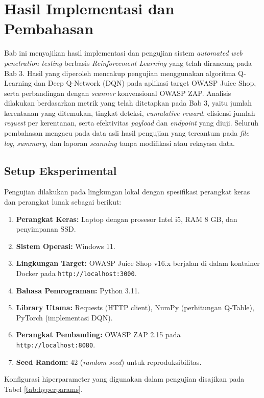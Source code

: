 \chapter{Hasil Implementasi dan Pembahasan}

Bab ini menyajikan hasil implementasi dan pengujian sistem \textit{automated web penetration testing} berbasis \textit{Reinforcement Learning} yang telah dirancang pada Bab 3. Hasil yang diperoleh mencakup pengujian menggunakan algoritma Q-Learning dan Deep Q-Network (DQN) pada aplikasi target OWASP Juice Shop, serta perbandingan dengan \textit{scanner} konvensional OWASP ZAP. Analisis dilakukan berdasarkan metrik yang telah ditetapkan pada Bab 3, yaitu jumlah kerentanan yang ditemukan, tingkat deteksi, \textit{cumulative reward}, efisiensi jumlah \textit{request} per kerentanan, serta efektivitas \textit{payload} dan \textit{endpoint} yang diuji. Seluruh pembahasan mengacu pada data asli hasil pengujian yang tercantum pada \textit{file log}, \textit{summary}, dan laporan \textit{scanning} tanpa modifikasi atau rekayasa data.

\section{Setup Eksperimental}

Pengujian dilakukan pada lingkungan lokal dengan spesifikasi perangkat keras dan perangkat lunak sebagai berikut:

\begin{enumerate}
    \item \textbf{Perangkat Keras:} Laptop dengan prosesor Intel i5, RAM 8 GB, dan penyimpanan SSD.
    \item \textbf{Sistem Operasi:} Windows 11.
    \item \textbf{Lingkungan Target:} OWASP Juice Shop v16.x berjalan di dalam kontainer Docker pada \texttt{http://localhost:3000}.
    \item \textbf{Bahasa Pemrograman:} Python 3.11.
    \item \textbf{Library Utama:} Requests (HTTP client), NumPy (perhitungan Q-Table), PyTorch (implementasi DQN).
    \item \textbf{Perangkat Pembanding:} OWASP ZAP 2.15 pada \texttt{http://localhost:8080}.
    \item \textbf{Seed Random:} 42 (\textit{random seed}) untuk reproduksibilitas.
\end{enumerate}

Konfigurasi hiperparameter yang digunakan dalam pengujian disajikan pada Tabel \ref{tab:hyperparams}.

